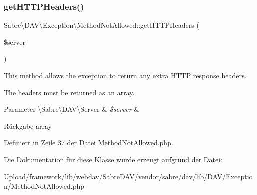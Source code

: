 \subsubsection{\texorpdfstring{get\+H\+T\+T\+P\+Headers()}{getHTTPHeaders()}}
{\footnotesize\ttfamily Sabre\textbackslash{}\+D\+A\+V\textbackslash{}\+Exception\textbackslash{}\+Method\+Not\+Allowed\+::get\+H\+T\+T\+P\+Headers (\begin{DoxyParamCaption}\item[{\textbackslash{}\mbox{\hyperlink{class_sabre_1_1_d_a_v_1_1_server}{Sabre\textbackslash{}\+D\+A\+V\textbackslash{}\+Server}}}]{\$server }\end{DoxyParamCaption})}

This method allows the exception to return any extra H\+T\+TP response headers.

The headers must be returned as an array.


\begin{DoxyParams}[1]{Parameter}
\textbackslash{}\+Sabre\textbackslash{}\+D\+A\+V\textbackslash{}\+Server & {\em \$server} & \\
\hline
\end{DoxyParams}
\begin{DoxyReturn}{Rückgabe}
array 
\end{DoxyReturn}


Definiert in Zeile 37 der Datei Method\+Not\+Allowed.\+php.



Die Dokumentation für diese Klasse wurde erzeugt aufgrund der Datei\+:\begin{DoxyCompactItemize}
\item 
Upload/framework/lib/webdav/\+Sabre\+D\+A\+V/vendor/sabre/dav/lib/\+D\+A\+V/\+Exception/Method\+Not\+Allowed.\+php\end{DoxyCompactItemize}
